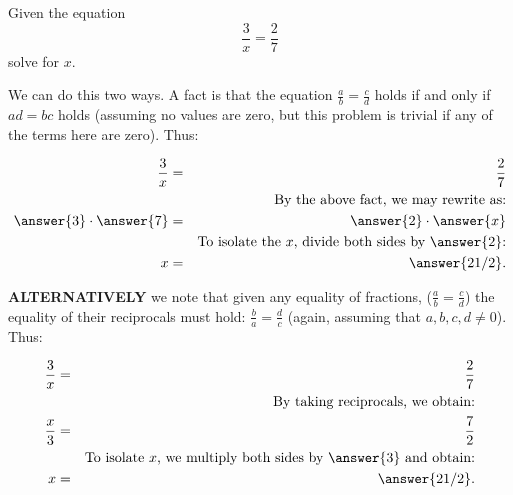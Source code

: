\documentclass{ximera}
\begin{document}
\begin{question}
Given the equation $$\frac{3}{x}=\frac{2}{7}$$ solve for $x$.

We can do this two ways.  A fact is that the equation $\frac{a}{b}=\frac{c}{d}$ holds if and only if $ad=bc$ holds (assuming no values are zero, but this problem is trivial if any of the terms here are zero).  Thus:

\begin{eqnarray*}
\frac{3}{x}&=& \frac{2}{7}\\
&&\text{By the above fact, we may rewrite as:}\\
\answer{3}\cdot\answer{7}&=& \answer{2}\cdot\answer{x}\\
&&\text{To isolate the $x$, divide both sides by $\answer{2}$:}\\
x&=& \answer{21/2}.
\end{eqnarray*}

\textbf{ALTERNATIVELY} we note that given any equality of fractions, ($\frac{a}{b}=\frac{c}{d}$) the equality of their reciprocals must hold: $\frac{b}{a}=\frac{d}{c}$ (again, assuming that $a,b,c,d\neq0$).  Thus:

\begin{eqnarray*}
\frac{3}{x}&=& \frac{2}{7}\\
&&\text{By taking reciprocals, we obtain:}\\
\frac{x}{3}&=& \frac{7}{2}\\
&&\text{To isolate $x$, we multiply both sides by $\answer{3}$ and obtain:}\\
x&=& \answer{21/2}.
\end{eqnarray*}


\end{question}
\end{document}
